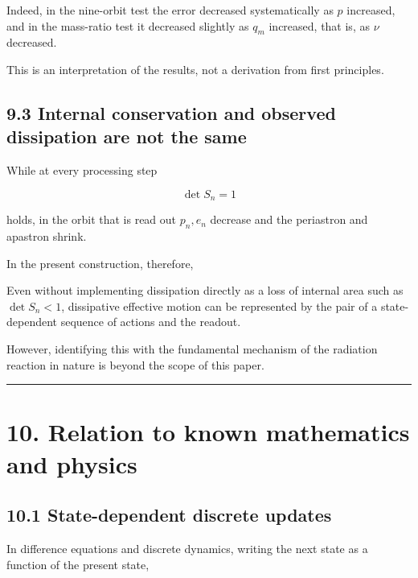 \documentclass[
  a4paper,
]{article}
\begin{document}
Indeed, in the nine-orbit test the error decreased systematically as
\(p\) increased, and in the mass-ratio test it decreased slightly as
\(q_m\) increased, that is, as \(\nu\) decreased.

This is an interpretation of the results, not a derivation from first
principles.

\subsection{9.3 Internal conservation and observed dissipation are not
the
same}\label{internal-conservation-and-observed-dissipation-are-not-the-same}

While at every processing step

\[
\det S_n=1
\]

holds, in the orbit that is read out \(p_n,e_n\) decrease and the
periastron and apastron shrink.

In the present construction, therefore,

\begin{center}
\end{center}

Even without implementing dissipation directly as a loss of internal
area such as \(\det S_n<1\), dissipative effective motion can be
represented by the pair of a state-dependent sequence of actions and the
readout.

However, identifying this with the fundamental mechanism of the
radiation reaction in nature is beyond the scope of this paper.

\begin{center}\rule{0.5\linewidth}{0.5pt}\end{center}

\section{10. Relation to known mathematics and
physics}\label{relation-to-known-mathematics-and-physics}

\subsection{10.1 State-dependent discrete
updates}\label{state-dependent-discrete-updates}

In difference equations and discrete dynamics, writing the next state as
a function of the present state,
\end{document}
